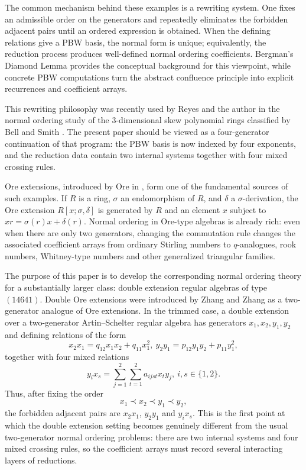 \documentclass{amsart}
\theoremstyle{definition}
\theoremstyle{remark}
\numberwithin{equation}{section}
\begin{document}
The common mechanism behind these examples is a rewriting system. One fixes an admissible order on the generators and repeatedly eliminates the forbidden adjacent pairs until an ordered expression is obtained. When the defining relations give a PBW basis, the normal form is unique; equivalently, the reduction process produces well-defined normal ordering coefficients. Bergman's Diamond Lemma \cite{Bergman1978} provides the conceptual background for this viewpoint, while concrete PBW computations turn the abstract confluence principle into explicit recurrences and coefficient arrays.

This rewriting philosophy was recently used by Reyes and the author in the normal ordering study of the $3$-dimensional skew polynomial rings classified by Bell and Smith \cite{BellSmith1990,RubianoReyes2026Combinatorial3D}. The present paper should be viewed as a four-generator continuation of that program: the PBW basis is now indexed by four exponents, and the reduction data contain two internal systems together with four mixed crossing rules.

Ore extensions, introduced by Ore in \cite{Ore1931,Ore1933}, form one of the fundamental sources of such examples. If $R$ is a ring, $\sigma$ an endomorphism of $R$, and $\delta$ a $\sigma$-derivation, the Ore extension $R[x;\sigma,\delta]$ is generated by $R$ and an element $x$ subject to $xr=\sigma(r)x+\delta(r)$. Normal ordering in Ore-type algebras is already rich: even when there are only two generators, changing the commutation rule changes the associated coefficient arrays from ordinary Stirling numbers to $q$-analogues, rook numbers, Whitney-type numbers and other generalized triangular families.

The purpose of this paper is to develop the corresponding normal ordering theory for a substantially larger class: double extension regular algebras of type $(14641)$. Double Ore extensions were introduced by Zhang and Zhang \cite{ZhangZhang2008,ZhangZhang2009} as a two-generator analogue of Ore extensions. In the trimmed case, a double extension over a two-generator Artin--Schelter regular algebra has generators $x_1,x_2,y_1,y_2$ and defining relations of the form
\[
x_2x_1=q_{12}x_1x_2+q_{11}x_1^2,
\
 y_2y_1=p_{12}y_1y_2+p_{11}y_1^2,
\]
together with four mixed relations
\[
y_ix_s=\sum_{j=1}^2\sum_{t=1}^2 a_{ijst}x_ty_j,
\ i,s\in\{1,2\}.
\]
Thus, after fixing the order
\[
x_1\prec x_2\prec y_1\prec y_2,
\]
the forbidden adjacent pairs are $x_2x_1$, $y_2y_1$ and $y_ix_s$. This is the first point at which the double extension setting becomes genuinely different from the usual two-generator normal ordering problems: there are two internal systems and four mixed crossing rules, so the coefficient arrays must record several interacting layers of reductions.
\end{document}
